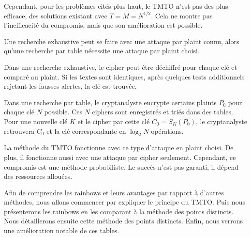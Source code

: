 		\bigskip

		Cependant, pour les problèmes cités plus haut, le \gls{TMTO} n'est pas des plus efficace, des solutions existant avec $T = M = N^{1/2}$. Cela ne montre pas l'inefficacité du compromis, mais que son amélioration est possible.

		\bigskip

		Une recherche exhaustive peut se faire avec une attaque par \gls{plaint} connu, alors qu'une recherche par table nécessite une attaque par \gls{plaint} choisi.

		\bigskip

		Dans une recherche exhaustive, le \gls{cipher} peut être déchiffré pour chaque clé et comparé au \gls{plaint}. Si les textes sont identiques, après quelques tests additionnels rejetant les fausses alertes, la clé est trouvée.

		\bigskip

		Dans une recherche par table, le cryptanalyste encrypte certains \glspl{plaint} $P_0$ pour chaque clé $N$ possible. Ces $N$ \glspl{cipher} sont enregistrés et triés dans des tables. Pour une nouvelle clé $K$ et le \gls{cipher} par cette clé $C_0 = S_K(P_0)$, le cryptanalyste retrouvera $C_0$ et la clé correspondante en $\log_2 N$ opérations.

		\bigskip

		La méthode du \gls{TMTO} fonctionne avec ce type d'attaque en \gls{plaint} choisi. De plus, il fonctionne aussi avec une attaque par \gls{cipher} seulement. Cependant, ce compromis est une méthode probabiliste. Le succès n'est pas garanti, il dépend des ressources allouées.

		\bigskip

		Afin de comprendre les \glspl{rainbow} et leurs avantages par rapport à d'autres méthodes, nous allons commencer par expliquer le principe du \gls{TMTO}. Puis nous présenterons les \glspl{rainbow} en les comparant à la méthode des points distincts. Nous détaillerons ensuite cette méthode des points distincts. Enfin, nous verrons une amélioration notable de ces tables.

\endinput{}

